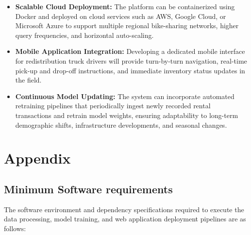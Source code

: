 \documentclass[12pt, a4paper]{article}
\renewcommand{\_}{\textunderscore\allowbreak}
\begin{document}
\begin{itemize}
    \item \textbf{Scalable Cloud Deployment:} The platform can be containerized using Docker and deployed on cloud services such as AWS, Google Cloud, or Microsoft Azure to support multiple regional bike-sharing networks, higher query frequencies, and horizontal auto-scaling.
    
    \item \textbf{Mobile Application Integration:} Developing a dedicated mobile interface for redistribution truck drivers will provide turn-by-turn navigation, real-time pick-up and drop-off instructions, and immediate inventory status updates in the field.
    
    \item \textbf{Continuous Model Updating:} The system can incorporate automated retraining pipelines that periodically ingest newly recorded rental transactions and retrain model weights, ensuring adaptability to long-term demographic shifts, infrastructure developments, and seasonal changes.
\end{itemize}

\clearpage

\section{Appendix}

\subsection{Minimum Software requirements}
The software environment and dependency specifications required to execute the data processing, model training, and web application deployment pipelines are as follows:
\end{document}
